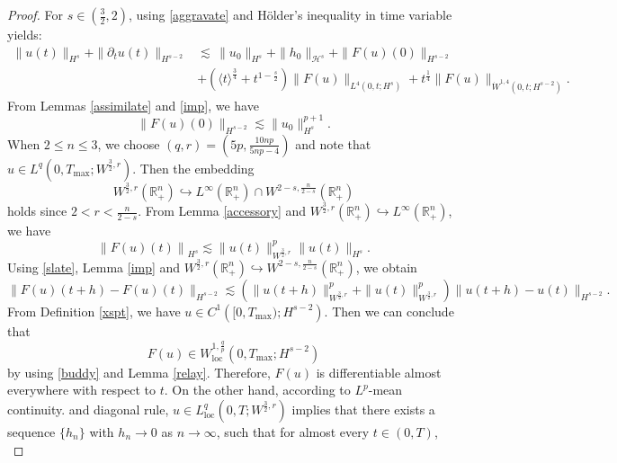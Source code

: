 \documentclass[preprint,compress,12pt]{elsarticle}
\numberwithin{equation}{section}
\begin{document}
\begin{proof}
	
	For $s\in \left(\frac{3}{2},2\right)$, using \eqref{aggravate} and H\"{o}lder's inequality in time variable yields:
	\begin{equation}\label{detain}
		\begin{aligned}	
			\|u(t)\|_{H^{s}}+\|\partial_{t}u(t)\|_{H^{s-2}}&
			\lesssim\,\|u_{0}\|_{H^{s}}+\|h_{0}\|_{\mathcal{H}^{s}}+ \|F(u)(0)\|_{H^{s-2}}\\
			&+\left(\langle t\rangle^{\frac{3}{4}}+t^{1-\frac{s}{2}}\right)\|F(u)\|_{L^{4}(0,t;H^{s})}+t^{\frac{1}{4}}\|F(u)\|_{\dot{W}^{1,4}(0,t;H^{s-2})}.
		\end{aligned}
	\end{equation}
	From Lemmas \ref{assimilate} and \ref{imp}, we have
	\begin{equation}\label{lawsuit}
		\|F(u)(0)\|_{H^{s-2}}\lesssim \|u_{0}\|_{H^{s}}^{p+1}.
	\end{equation}
	When $2\leq n\leq3$, we choose $(q, r)=\left(5p, \frac{10np}{5np-4}\right)$ and note that $u\in L^{q}(0,T_{\max};W^{\frac{3}{2},r})$. Then the embedding \[W^{\frac{3}{2},r}(\mathbb{R}_{+}^{n})\hookrightarrow L^{\infty}(\mathbb{R}_{+}^{n})\cap W^{2-s,\frac{n}{2-s}}(\mathbb{R}_{+}^{n})\] holds since $2<r<\frac{n}{2-s}$.
	From Lemma \ref{accessory} and $W^{\frac{3}{2},r}(\mathbb{R}_{+}^{n})\hookrightarrow L^{\infty}(\mathbb{R}_{+}^{n})$, we have
	\begin{equation}\label{radiant}
		\left\|F(u)(t)\right\|_{H^{s}}\lesssim \|u(t)\|_{W^{\frac{3}{2},r}}^{p}\|u(t)\|_{H^{s}}.
	\end{equation}
	Using \eqref{slate}, Lemma \ref{imp} and $W^{\frac{3}{2},r}(\mathbb{R}_{+}^{n})\hookrightarrow W^{2-s,\frac{n}{2-s}}(\mathbb{R}_{+}^{n})$, we obtain
	\begin{equation}\label{buddy}
		\|F(u)(t+h)-F(u)(t)\|_{H^{s-2}}\lesssim \left(\|u(t+h)\|_{W^{\frac{3}{2},r}}^{p}+\|u(t)\|_{W^{\frac{3}{2},r}}^{p}\right) \|u(t+h)-u(t)\|_{H^{s-2}}.
	\end{equation}
	From Definition \ref{xspt}, we have $u\in C^{1}\left([0,T_{\max});H^{s-2}\right)$.
	Then we can conclude that $$F(u)\in W_{\mathrm{loc}}^{1,\frac{q}{p}}(0,T_{\max};H^{s-2})$$ by using \eqref{buddy} and Lemma \ref{relay}. Therefore, $F(u)$ is differentiable almost everywhere with respect to $t$. On the other hand, according to $L^{p}$-mean continuity.  and diagonal rule,  $u\in L^{q}_{\mathrm{loc}}(0,T;W^{\frac{3}{2},r})$ implies that there exists a sequence $\{h_{n}\}$ with $h_{n}\rightarrow0$ as $ n\rightarrow\infty$, such that for almost every $t\in (0,T)$,
	\begin{equation*}

\end{equation*}
\end{proof}
\end{document}
